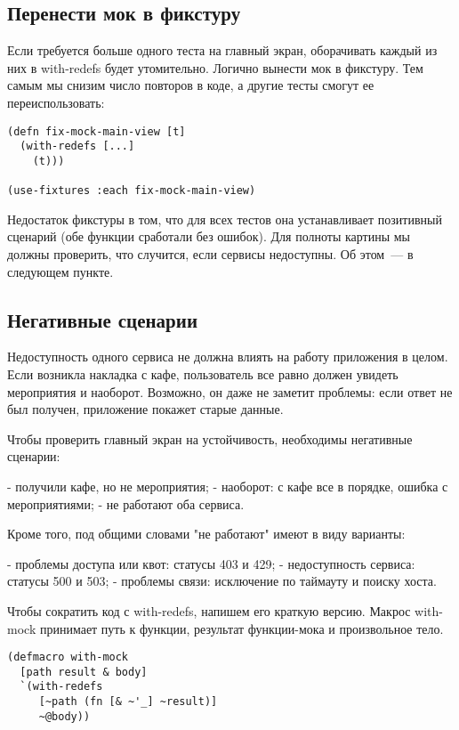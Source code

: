\subsection{Перенести мок в фикстуру}

Если требуется больше одного теста на главный экран, оборачивать каждый из них в
with-redefs будет утомительно. Логично вынести мок в фикстуру. Тем самым мы
снизим число повторов в коде, а другие тесты смогут ее переиспользовать:

\begin{verbatim}
(defn fix-mock-main-view [t]
  (with-redefs [...]
    (t)))

(use-fixtures :each fix-mock-main-view)
\end{verbatim}

Недостаток фикстуры в том, что для всех тестов она устанавливает позитивный
сценарий (обе функции сработали без ошибок). Для полноты картины мы должны
проверить, что случится, если сервисы недоступны. Об этом~--- в следующем пункте.

\subsection{Негативные сценарии}

Недоступность одного сервиса не должна влиять на работу приложения в целом. Если
возникла накладка с кафе, пользователь все равно должен увидеть мероприятия и
наоборот. Возможно, он даже не заметит проблемы: если ответ не был получен,
приложение покажет старые данные.

Чтобы проверить главный экран на устойчивость, необходимы негативные сценарии:

- получили кафе, но не мероприятия;
- наоборот: с кафе все в порядке, ошибка с мероприятиями;
- не работают оба сервиса.

Кроме того, под общими словами "не работают" имеют в виду варианты:

- проблемы доступа или квот: статусы 403 и 429;
- недоступность сервиса: статусы 500 и 503;
- проблемы связи: исключение по таймауту и поиску хоста.

Чтобы сократить код с with-redefs, напишем его краткую версию. Макрос with-mock
принимает путь к функции, результат функции-мока и произвольное тело.

\begin{verbatim}
(defmacro with-mock
  [path result & body]
  `(with-redefs
     [~path (fn [& ~'_] ~result)]
     ~@body))
\end{verbatim}

